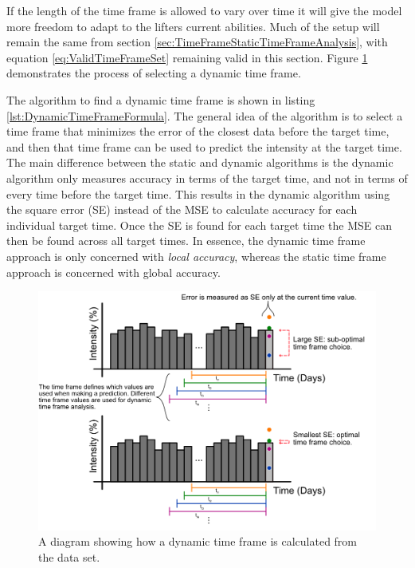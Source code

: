 If the length of the time frame is allowed to vary over time it will give the model more freedom to adapt to the lifters current abilities. Much of the setup will remain the same from section \ref{sec:TimeFrameStaticTimeFrameAnalysis}, with equation \ref{eq:ValidTimeFrameSet} remaining valid in this section.  Figure \ref{fig:DynamicTimeFrameDiagram} demonstrates the process of selecting a dynamic time frame.

The algorithm to find a dynamic time frame is shown in listing \ref{lst:DynamicTimeFrameFormula}. The general idea of the algorithm is to select a time frame that minimizes the error of the closest data before the target time, and then that time frame can be used to predict the intensity at the target time. The main difference between the static and dynamic algorithms is the dynamic algorithm only measures accuracy in terms of the target time, and not in terms of every time before the target time. This results in the dynamic algorithm using the square error (SE) instead of the MSE to calculate accuracy for each individual target time. Once the SE is found for each target time the MSE can then be found across all target times. In essence, the dynamic time frame approach is only concerned with \textit{local accuracy}, whereas the static time frame approach is concerned with global accuracy.

\begin{figure}[h]
    \centering
    \includegraphics[width=150mm]{Diagrams/DynamicTimeFrameDiagram.png}
    \caption{A diagram showing how a dynamic time frame is calculated from the data set.}
    \label{fig:DynamicTimeFrameDiagram}
\end{figure}

